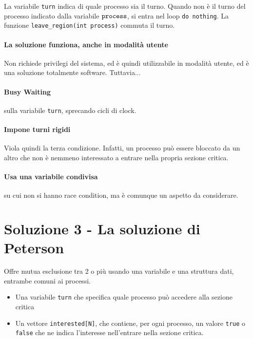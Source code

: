 \documentclass{report}
\begin{document}
La variabile \verb|turn| indica di quale processo sia il turno. Quando non è il turno del processo indicato dalla variabile $\verb|process|$, si entra nel loop \verb|do nothing|.
La funzione \verb|leave_region(int process)| commuta il turno.

\paragraph{La soluzione funziona, anche in modalità utente}
Non richiede privilegi del sistema, ed è quindi utilizzabile in modalità utente, ed è una soluzione totalmente software. Tuttavia...

\paragraph{Busy Waiting} sulla variabile \verb|turn|, sprecando cicli di clock.
\paragraph{Impone turni rigidi} Viola quindi la terza condizione. Infatti, un processo può essere bloccato da un altro che non è nemmeno interessato a entrare nella propria sezione critica. 
\paragraph{Usa una variabile condivisa} su cui non si hanno race condition, ma è comunque un aspetto da considerare.

\section{Soluzione 3 - La soluzione di Peterson}

Offre mutua esclusione tra 2 o più usando una variabile e una struttura dati, entrambe comuni ai processi.

\begin{itemize}
    \item Una variabile \verb|turn| che specifica quale processo può accedere alla sezione critica
    
    \item Un vettore \verb|interested[N]|, che contiene, per ogni processo, un valore \verb|true| o \verb|false| che ne indica l'interesse nell'entrare nella sezione critica.
\end{itemize}
\end{document}
